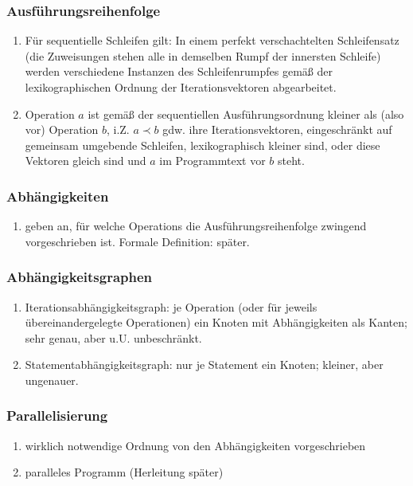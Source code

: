 \subsubsection{Ausführungsreihenfolge}
\begin{enumerate}
  \item Für sequentielle Schleifen gilt: In einem perfekt
    verschachtelten Schleifensatz (die Zuweisungen stehen alle in
    demselben Rumpf der innersten Schleife) werden verschiedene
    Instanzen des Schleifenrumpfes gemäß der lexikographischen Ordnung
    der Iterationsvektoren abgearbeitet.
  \item Operation $a$ ist gemäß der sequentiellen Ausführungsordnung
    kleiner als (also vor) Operation $b$, i.Z. $a \prec b$ gdw. ihre
    Iterationsvektoren, eingeschränkt auf gemeinsam umgebende Schleifen,
    lexikographisch kleiner sind, oder diese Vektoren gleich sind und
    $a$ im Programmtext vor $b$ steht.
\end{enumerate}

\subsubsection{Abhängigkeiten}
\begin{enumerate}
  \item geben an, für welche Operations die Ausführungsreihenfolge zwingend vorgeschrieben ist. Formale Definition: später.
\end{enumerate}

\subsubsection{Abhängigkeitsgraphen}
\begin{enumerate}
  \item Iterationsabhängigkeitsgraph: je Operation (oder für jeweils übereinandergelegte Operationen) ein Knoten mit Abhängigkeiten als Kanten; sehr genau, aber u.U. unbeschränkt.
  \item Statementabhängigkeitsgraph: nur je Statement ein Knoten; kleiner, aber ungenauer.
\end{enumerate}

\subsubsection{Parallelisierung}
\begin{enumerate}
  \item wirklich notwendige Ordnung von den Abhängigkeiten vorgeschrieben
  \item paralleles Programm (Herleitung später)
\end{enumerate}




